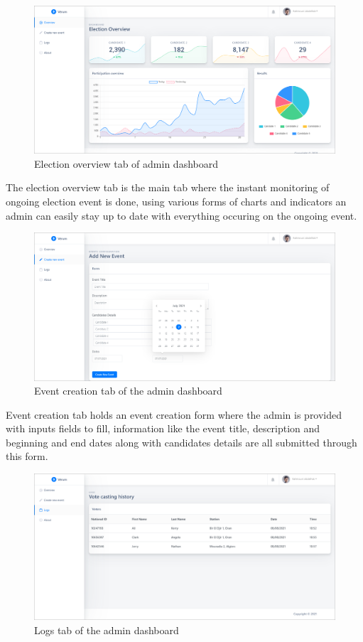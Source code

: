\begin{figure}[H]
	\centering
		\includegraphics[width=14cm]{images/chapter3/admin_1.png}
		\caption{{\footnotesize Election overview tab of admin dashboard}}
\end{figure}

The election overview tab is the main tab where the instant monitoring of ongoing election event is done, using various forms of charts and indicators an admin can easily stay up to date with everything occuring on the ongoing event.

\begin{figure}[H]
	\centering
		\includegraphics[width=14cm]{images/chapter3/admin_2.png}
		\caption{{\footnotesize Event creation tab of the admin dashboard}}
\end{figure}

Event creation tab holds an event creation form where the admin is provided with inputs fields to fill, information like the event title, description and beginning and end dates along with candidates details are all submitted through this form.

\begin{figure}[H]
	\centering
		\includegraphics[width=14cm]{images/chapter3/admin_3.png}
		\caption{{\footnotesize Logs tab of the admin dashboard}}
\end{figure}

